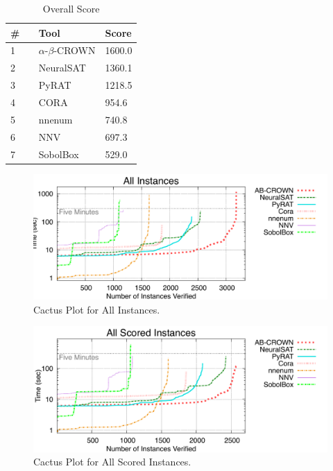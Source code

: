 

\begin{table}[h]
\begin{center}
\caption{Overall Score} \label{tab:score}
{\setlength{\tabcolsep}{2pt}
\begin{tabular}[h]{@{}lll@{}}
\toprule
\textbf{\# ~} & \textbf{Tool} & \textbf{Score}\\
\midrule
1 & $\alpha$-$\beta$-CROWN & 1600.0 \\
2 & NeuralSAT & 1360.1 \\
3 & PyRAT & 1218.5 \\
4 & CORA & 954.6 \\
5 & nnenum & 740.8 \\
6 & NNV & 697.3 \\
7 & SobolBox & 529.0 \\
\bottomrule
\end{tabular}
}
\end{center}
\end{table}



\begin{figure}[h]
\centerline{\includegraphics[width=\textwidth]{cactus/all.pdf}}
\caption{Cactus Plot for All Instances.}
\label{fig:quantPic}
\end{figure}


\begin{figure}[h]
\centerline{\includegraphics[width=\textwidth]{cactus/all_scored.pdf}}
\caption{Cactus Plot for All Scored Instances.}
\label{fig:quantPic}
\end{figure}

